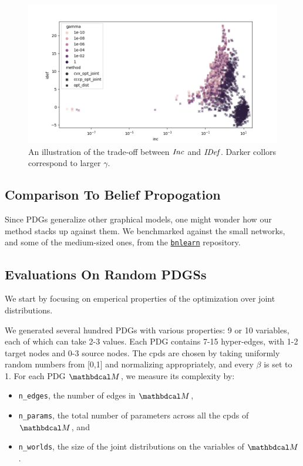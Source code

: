 \documentclass[twoside]{article}
\begin{document}
\begin{figure}
    \includegraphics[width=\linewidth]{figs/inc-idef2}
    \caption{An illustration of the trade-off between $\mathit{Inc}$ and $\mathit{IDef}_{\!}$. Darker collors correspond to larger $\gamma$.}\label{fig:inc-idef}
\end{figure}

\subsection{Comparison To Belief Propogation}

Since PDGs generalize other graphical models, one might wonder how our method stacks up against them. 
We benchmarked against the small networks, and some of the medium-sized ones, from the \href{https://www.bnlearn.com/bnrepository/}{\texttt{bnlearn}} repository. 



\subsection{Evaluations On Random PDGSs}
We start by focusing on emperical properties of the optimization over joint distributions.

We generated several hundred PDGs with various properties: 9 or 10 variables, each of which can take 2-3 values. Each PDG contains 7-15 hyper-edges, with 1-2 target nodes and 0-3 source nodes. The cpds are chosen by taking uniformly random numbers from [0,1] and normalizing appropriately, and every $\beta$ is set to 1.
For each PDG $\dg M$, we measure its complexity by:
\begin{itemize}[nosep]
    \item \texttt{n\_edges}, the number of edges in $\dg M$,
    \item \texttt{n\_params}, the total number of parameters across all the cpds of $\dg M$, and
    \item \texttt{n\_worlds}, the size of the joint distributions on the variables of $\dg M$.
\end{itemize}
\end{document}
